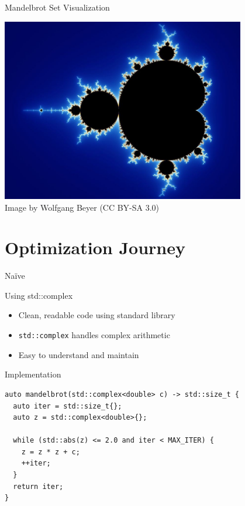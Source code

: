 \documentclass{beamer}
\begin{document}
\begin{frame}{Mandelbrot Set Visualization}
    \begin{center}
        \includegraphics[width=0.8\textwidth]{images/mandelbrot_set_1.jpg}
        \\[0.5em]
        \footnotesize Image by Wolfgang Beyer (CC BY-SA 3.0)
    \end{center}
\end{frame}

\section{Optimization Journey}
\begin{frame}[fragile]{Naïve}
    \begin{block}{Using std::complex}
        \begin{itemize}
            \item Clean, readable code using standard library
            \item \texttt{std::complex} handles complex arithmetic
            \item Easy to understand and maintain
        \end{itemize}
    \end{block}
    \begin{exampleblock}{Implementation}
        \begin{verbatim}
auto mandelbrot(std::complex<double> c) -> std::size_t {
  auto iter = std::size_t{};
  auto z = std::complex<double>{};
  
  while (std::abs(z) <= 2.0 and iter < MAX_ITER) {
    z = z * z + c;
    ++iter;
  }
  return iter;
}
        \end{verbatim}
    \end{exampleblock}
\end{frame}
\end{document}
